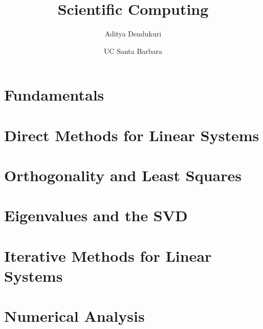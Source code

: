 \documentclass[12pt]{article} %
\title{Scientific Computing}
\author{Aditya Dendukuri}
\date{\vskip 10pt UC Santa Barbara}
\begin{document}
    \maketitle
    \tableofcontents
    \newpage
    

    \section{Fundamentals}
    
    
    
    
    
    
    
    \newpage

    \section{Direct Methods for Linear Systems}
    
    
    

    \section{Orthogonality and Least Squares}
    
    
    
    
    

    \section{Eigenvalues and the SVD}
    
    
    
    

    \section{Iterative Methods for Linear Systems}
    
    
    
    

    \section{Numerical Analysis}
    
    
    
\end{document}

